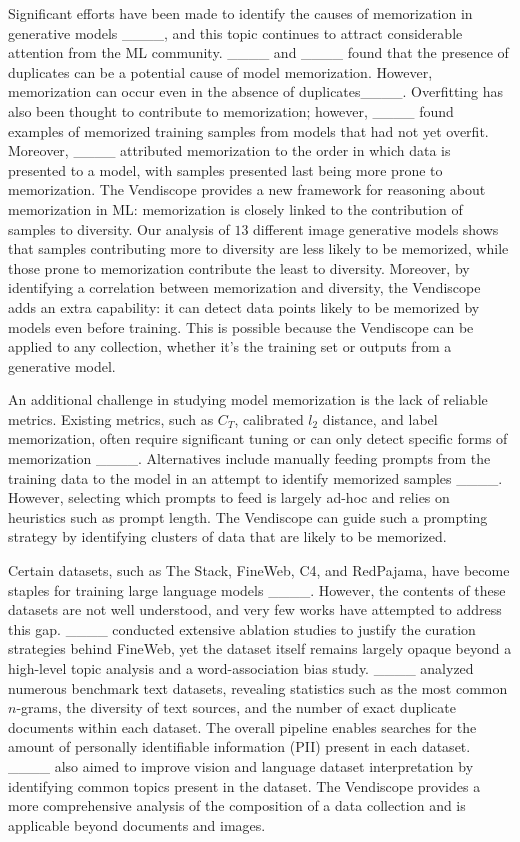  Significant efforts have been made to identify the causes of memorization in generative models ____, and this topic continues to attract considerable attention from the ML community. ____ and ____ found that the presence of duplicates can be a potential cause of model memorization. However, memorization can occur even in the absence of duplicates____. Overfitting has also been thought to contribute to memorization; however, ____ found examples of memorized training samples from models that had not yet overfit. Moreover, ____ attributed memorization to the order in which data is presented to a model, with samples presented last being more prone to memorization. The Vendiscope provides a new framework for reasoning about memorization in ML: memorization is closely linked to the contribution of samples to diversity. Our analysis of $13$ different image generative models shows that samples contributing more to diversity are less likely to be memorized, while those prone to memorization contribute the least to diversity. Moreover, by identifying a correlation between memorization and diversity, the Vendiscope adds an extra capability: it can detect data points likely to be memorized by models even before training. This is possible because the Vendiscope can be applied to any collection, whether it's the training set or outputs from a generative model.

An additional challenge in studying model memorization is the lack of reliable metrics. Existing metrics, such as \(C_T\), calibrated \(l_2\) distance, and label memorization, often require significant tuning or can only detect specific forms of memorization ____. Alternatives include manually feeding prompts from the training data to the model in an attempt to identify memorized samples ____. However, selecting which prompts to feed is largely ad-hoc and relies on heuristics such as prompt length. The Vendiscope can guide such a prompting strategy by identifying clusters of data that are likely to be memorized.

 Certain datasets, such as The Stack, FineWeb, C4, and RedPajama, have become staples for training large language models ____. However, the contents of these datasets are not well understood, and very few works have attempted to address this gap. ____ conducted extensive ablation studies to justify the curation strategies behind FineWeb, yet the dataset itself remains largely opaque beyond a high-level topic analysis and a word-association bias study. ____ analyzed numerous benchmark text datasets, revealing statistics such as the most common $n$-grams, the diversity of text sources, and the number of exact duplicate documents within each dataset. The overall pipeline enables searches for the amount of personally identifiable information (PII) present in each dataset. ____ also aimed to improve vision and language dataset interpretation by identifying common topics present in the dataset. The Vendiscope provides a more comprehensive analysis of the composition of a data collection and is applicable beyond documents and images.

